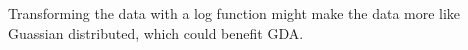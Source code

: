 \begin{answer}
    Transforming the data with a log function might make the data
    more like Guassian distributed, which could benefit GDA.
\end{answer}
